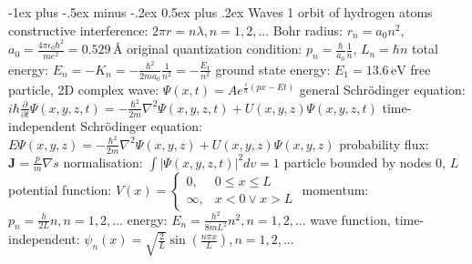 \documentclass[10pt,landscape]{article}
\makeatletter
\renewcommand{\subsection}{\@startsection{subsection}{2}{0mm}%
                                {-1ex plus -.5ex minus -.2ex}%
                                {0.5ex plus .2ex}%
                                {\normalfont\normalsize\bfseries}}
\newcommand{\spc}{\hspace*{1em}}
\makeatother
\begin{document}
\begin{multicols*}{3}
\subsection{Waves 1}
orbit of hydrogen atoms
\newline
\spc constructive interference: $2\pi r=n\lambda,n=1,2,...$
\newline
\spc Bohr radius: $r_n=a_0n^2$, $a_0=\frac{4\pi\epsilon_0\hbar^2}{me^2}=0.529\,\textrm{\AA }$
\newline
\spc original quantization condition: $p_n=\frac{\hbar}{a_0}\frac{1}{n}$,  $L_n=\hbar n$
\newline
\spc total energy: $E_n=-K_n=-\frac{\hbar^2}{2ma_0}\frac{1}{n^2}=-\frac{E_1}{n^2}$
\newline
\spc ground state energy: $E_1=13.6\,\textrm{eV}$
\newline \newline
free particle, 2D complex wave: $\Psi(x,t)=Ae^{\frac{i}{\hbar}(px-Et)}$
\newline
\newline
general Schrödinger equation:
\newline
\spc $i\hbar \frac{\partial}{\partial t}\Psi(x,y,z,t)=-\frac{\hbar^2}{2m}\nabla^2\Psi(x,y,z,t)+U(x,y,z)\Psi(x,y,z,t)$
\newline
time-independent Schrödinger equation:
\newline
\spc $E\Psi(x,y,z)=-\frac{\hbar^2}{2m}\nabla^2\Psi(x,y,z)+U(x,y,z)\Psi(x,y,z)$
\newline
probability flux: $\mathbf{J}=\frac{p}{m}\nabla s$
\newline
normalisation: $\int |\Psi(x,y,z,t)|^2dv=1$
\newline \newline
particle bounded by nodes $0$, $L$
\newline
\spc potential function: $V(x)=\left\{\begin{matrix}
0,&0\leq x\leq L\\ \infty,&x<0\vee x>L 
\end{matrix}\right.$
\newline
\spc momentum: $p_n=\frac{h}{2L}n,n=1,2,...$
\newline
\spc energy: $E_n=\frac{h^2}{8mL^2}n^2,n=1,2,...$
\newline
\spc wave function, time-independent:
\newline
\spc \spc $\psi_n(x)=\sqrt{\frac{2}{L}}\sin(\frac{n\pi x}{L}),n=1,2,...$
\newline\newline

\end{multicols*}
\end{document}
